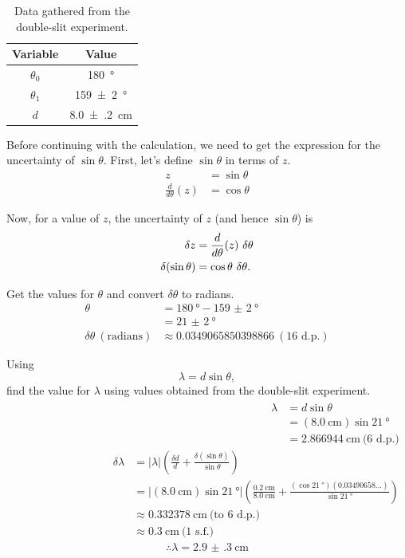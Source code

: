 \documentclass[letter,12pt]{article}
\newcommand{\tlambda}{\(\lambda\) }
\newcommand{\ttheta}{\(\theta\) }
\numberwithin{equation}{section}
\numberwithin{figure}{section}
\numberwithin{table}{section}
\begin{document}
\begin{table}[!ht]
  \centering
  \begin{tabular}{cS}
    \toprule
    {Variable} & {Value} \\ \midrule
    \(\theta_0\) & \SI{180}{\degree} \\
    \(\theta_1\) & \SI{159(2)}{\degree} \\
    \(d\) & \SI{8.0(2)}{\cm} \\
    \bottomrule
  \end{tabular}
  \caption{Data gathered from the double-slit experiment.}
  \label{table:e2}
\end{table}

Before continuing with the calculation, we need to get the expression for the uncertainty of \(\sin{} \theta\). First, let's define \(\sin \theta\) in terms of \(z\).
\begin{align*}
  z &= \sin \theta \\
  \frac{d}{d\theta}(z) &= \cos \theta 
\end{align*}

Now, for a value of \(z\), the uncertainty of \(z\) (and hence \(\sin \theta \)) is
\begin{align} \label{eq:e2}
  \delta z &= \frac{d}{d \theta}(z) \  \delta \theta \notag \\
  \delta (\sin \theta) &= \cos \theta \ \delta \theta.
\end{align}

Get the values for \ttheta and convert \(\delta\theta\) to radians.
\begin{align*}
  \theta &= \SI{180}{\degree} - \SI{159(2)}{\degree} \\
  &= \SI{21(2)}{\degree} \\
  \delta \theta \ (\mathrm{radians}) &\approx 0.0349065850398866 \ (\text{16 d.p.})
\end{align*}

Using \[\lambda = d \sin \theta,\] find the value for \tlambda using values obtained from the double-slit experiment.
\begin{align*}
  \begin{split}
    \lambda &= d \sin \theta \\
    &= (\SI{8.0}{\cm}) \sin{\SI{21}{\degree}} \\
    &= \SI{2.866944}{\cm} \ \text{(6 d.p.)}
  \end{split}
  \begin{split}
    \delta \lambda &= |\lambda| \left( \frac{\delta d}{d} + \frac{\delta (\sin\theta)}{\sin \theta} \right) \\
    &= |(\SI{8.0}{\cm}) \sin{\SI{21}{\degree}}| \left( \frac{\SI{0.2}{\cm}}{\SI{8.0}{\cm}} + \frac{(\cos{\SI{21}{\degree}})(0.03490658\dots)}{\sin{\SI{21}{\degree}}} \right) \\
    &\approx \SI{0.332378}{\cm} \ \text{(to 6 d.p.)} \\
    &\approx \SI{0.3}{\cm} \ \text{(1 s.f.)}
  \end{split}
\end{align*}
\[\therefore \lambda = \SI{2.9(3)}{\cm}\]
\end{document}
